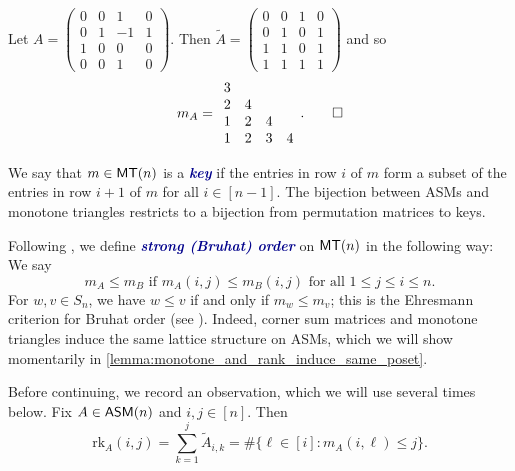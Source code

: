 \documentclass[12 pt]{amsart}
\newcommand{\newword}[1]{\textcolor{darkblue}{\textbf{\emph{#1}}}}
\numberwithin{equation}{section}
\newcommand{\rk}{\mathrm{rk}}
\theoremstyle{remark}
\newenvironment{example}
  {\pushQED{\qed}\renewcommand{\qedsymbol}{$\diamondsuit$}\examplex}
  {\popQED\endexamplex}
\newcommand{\asm}{{\sf ASM}}
\newcommand{\monotone}{{\sf MT}}
\begin{document}
\begin{example}
\label{ex: asm to monotone}
      Let 
  $A=\begin{pmatrix}
0  &0 & 1 & 0\\
 0 & 1& -1 & 1\\
 1 & 0 & 0 & 0\\
 0 & 0 & 1 & 0
    \end{pmatrix}.$  
Then $\widetilde{A} = \begin{pmatrix}
0 & 0 & 1 & 0 \\
0 & 1 & 0 & 1 \\
1 & 1 & 0 & 1 \\
1 & 1 & 1 & 1
\end{pmatrix}$ and so
\[
m_A =
\begin{array}{cccc}
3\\
2&4\\
1&2&4\\
1&2&3&4
\end{array}.\qedhere
\]
\end{example}

We say that $m\in \monotone(n)$ is a \newword{key} if the entries in row $i$ of $m$ form a subset of the entries in row $i+1$ of $m$ for all $i\in[n-1]$.  
The bijection between ASMs and monotone triangles restricts to a bijection from permutation matrices to keys.  



Following \cite{LS96}, we define \newword{strong (Bruhat) order} on $\monotone(n)$ in the following way: We say \[m_A\leq m_B \text{ if } m_A(i,j)\leq m_B(i,j) \text{ for all } 1\leq j\leq i\leq n.\]  
For $w,v\in S_n$, we have $w\leq v$ if and only if $m_w\leq m_v$; this is the Ehresmann criterion for Bruhat order (see \cite[Theorem 2.6.3]{BB05}). 
 Indeed, corner sum matrices and monotone triangles induce the same lattice structure on ASMs, which we will show momentarily in \cref{lemma:monotone_and_rank_induce_same_poset}.

Before continuing, we record an observation, which we will use several times below. Fix $A \in \asm(n)$ and $i,j \in [n]$. Then 
\begin{equation}\label{eq:rank-from-triangle}
    \rk_A(i,j) = \sum_{k=1}^j \widetilde{A}_{i,k} = \#\{\ell \in [i] : m_A(i,\ell) \leq j\}.
\end{equation}
\end{document}
